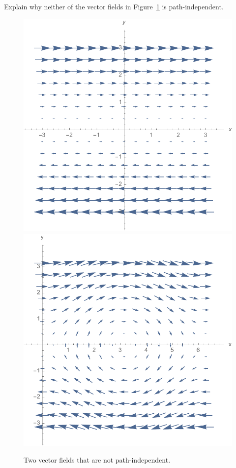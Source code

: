 \begin{activity} \label{A:12.4.4}  
Explain why neither of the vector fields in
Figure~\ref{F:12.4.non-path-indep} is path-independent.
\begin{figure}
  \centering
  \includegraphics[width=0.45\linewidth]{figures/fig_12_4_field1.pdf}\hspace{0.1\linewidth}\includegraphics[width=0.45\linewidth]{figures/fig_12_4_field2.pdf}
  \caption{Two vector fields that are not path-independent.}
  \label{F:12.4.non-path-indep}
\end{figure}
\end{activity}
\begin{smallhint}

\end{smallhint}
\begin{bighint}

\end{bighint}
\begin{activitySolution}

\end{activitySolution}
\aftera
